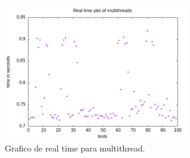 \documentclass[12pt]{article}
\begin{document}
    \begin{figure}[H]
        \caption{Grafico de real time para multithread.}
        \centering
        \includegraphics[width=8cm]{doc/real_threads.png}
    \end{figure}
\end{document}
